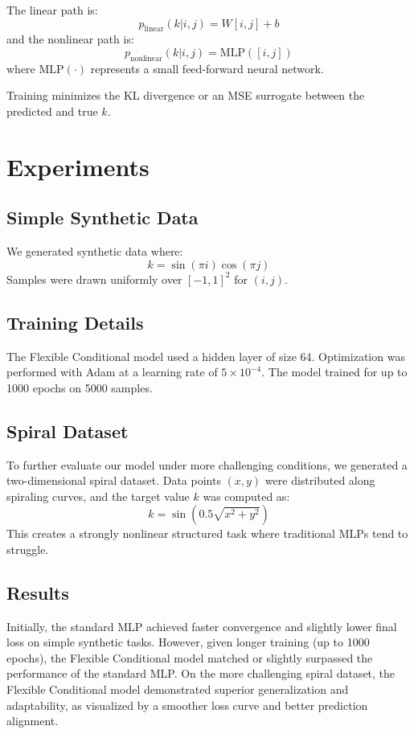 \documentclass[11pt]{article}
\begin{document}
The linear path is:
\begin{equation}
    p_{\text{linear}}(k|i,j) = W[i, j] + b
\end{equation}
and the nonlinear path is:
\begin{equation}
    p_{\text{nonlinear}}(k|i,j) = \text{MLP}([i,j])
\end{equation}
where $\text{MLP}(\cdot)$ represents a small feed-forward neural network.

Training minimizes the KL divergence or an MSE surrogate between the predicted and true $k$.

\section{Experiments}
\subsection{Simple Synthetic Data}
We generated synthetic data where:
\begin{equation}
    k = \sin(\pi i) \cos(\pi j)
\end{equation}
Samples were drawn uniformly over $[-1,1]^2$ for $(i,j)$.

\subsection{Training Details}
The Flexible Conditional model used a hidden layer of size 64. Optimization was performed with Adam at a learning rate of $5 \times 10^{-4}$. The model trained for up to 1000 epochs on 5000 samples.

\subsection{Spiral Dataset}
To further evaluate our model under more challenging conditions, we generated a two-dimensional spiral dataset. Data points $(x,y)$ were distributed along spiraling curves, and the target value $k$ was computed as:
\begin{equation}
    k = \sin(0.5 \sqrt{x^2 + y^2})
\end{equation}
This creates a strongly nonlinear structured task where traditional MLPs tend to struggle.

\subsection{Results}
Initially, the standard MLP achieved faster convergence and slightly lower final loss on simple synthetic tasks. However, given longer training (up to 1000 epochs), the Flexible Conditional model matched or slightly surpassed the performance of the standard MLP. On the more challenging spiral dataset, the Flexible Conditional model demonstrated superior generalization and adaptability, as visualized by a smoother loss curve and better prediction alignment.
\end{document}

